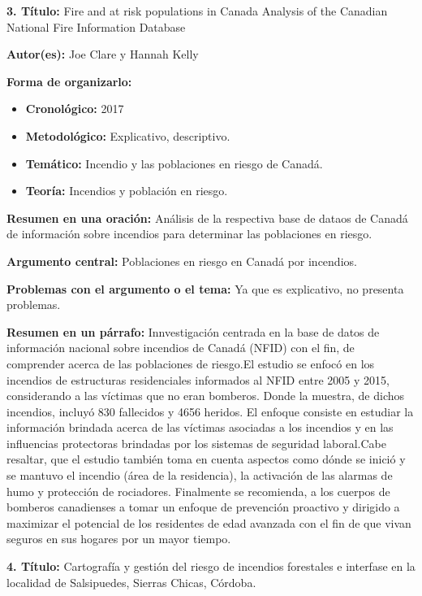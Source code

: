 \documentclass[
  oneside]{memoir}
\begin{document}
\textbf{ 3. Título:} Fire and at risk populations in Canada Analysis of
the Canadian National Fire Information Database

\textbf{Autor(es):} Joe Clare y Hannah Kelly

\textbf{Forma de organizarlo:}

\begin{itemize}

\item \textbf{Cronológico:} 2017

\item \textbf{Metodológico:} Explicativo, descriptivo.

\item \textbf{Temático:} Incendio y las poblaciones en riesgo de Canadá.

\item \textbf{Teoría:} Incendios y población en riesgo.
\end{itemize}

\textbf{Resumen en una oración:} Análisis de la respectiva base de
dataos de Canadá de información sobre incendios para determinar las
poblaciones en riesgo.

\textbf{Argumento central:} Poblaciones en riesgo en Canadá por
incendios.

\textbf{Problemas con el argumento o el tema:} Ya que es explicativo, no
presenta problemas.

\textbf{Resumen en un párrafo:} Innvestigación centrada en la base de
datos de información nacional sobre incendios de Canadá (NFID) con el
fin, de comprender acerca de las poblaciones de riesgo.El estudio se
enfocó en los incendios de estructuras residenciales informados al NFID
entre 2005 y 2015, considerando a las víctimas que no eran bomberos.
Donde la muestra, de dichos incendios, incluyó 830 fallecidos y 4656
heridos. El enfoque consiste en estudiar la información brindada acerca
de las víctimas asociadas a los incendios y en las influencias
protectoras brindadas por los sistemas de seguridad laboral.Cabe
resaltar, que el estudio también toma en cuenta aspectos como dónde se
inició y se mantuvo el incendio (área de la residencia), la activación
de las alarmas de humo y protección de rociadores. Finalmente se
recomienda, a los cuerpos de bomberos canadienses a tomar un enfoque de
prevención proactivo y dirigido a maximizar el potencial de los
residentes de edad avanzada con el fin de que vivan seguros en sus
hogares por un mayor tiempo.

\textbf{ 4. Título:} Cartografía y gestión del riesgo de incendios
forestales e interfase en la localidad de Salsipuedes, Sierras Chicas,
Córdoba.
\end{document}
